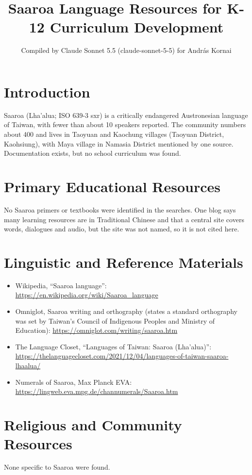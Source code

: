 \documentclass[12pt]{article}
\title{Saaroa Language Resources for K-12 Curriculum Development}
\author{Compiled by Claude Sonnet 5.5 (claude-sonnet-5-5) for Andr\'as Kornai}
\date{}
\begin{document}
\maketitle

\section{Introduction}
Saaroa (Lha'alua; ISO 639-3 sxr) is a critically endangered Austronesian language of Taiwan, with fewer than about 10 speakers reported. The community numbers about 400 and lives in Taoyuan and Kaochung villages (Taoyuan District, Kaohsiung), with Maya village in Namasia District mentioned by one source. Documentation exists, but no school curriculum was found.

\section{Primary Educational Resources}
No Saaroa primers or textbooks were identified in the searches. One blog says many learning resources are in Traditional Chinese and that a central site covers words, dialogues and audio, but the site was not named, so it is not cited here.

\section{Linguistic and Reference Materials}
\begin{itemize}
\item Wikipedia, ``Saaroa language'': \url{https://en.wikipedia.org/wiki/Saaroa_language}
\item Omniglot, Saaroa writing and orthography (states a standard orthography was set by Taiwan's Council of Indigenous Peoples and Ministry of Education): \url{https://omniglot.com/writing/saaroa.htm}
\item The Language Closet, ``Languages of Taiwan: Saaroa (Lha'alua)'': \url{https://thelanguagecloset.com/2021/12/04/languages-of-taiwan-saaroa-lhaalua/}
\item Numerals of Saaroa, Max Planck EVA: \url{https://lingweb.eva.mpg.de/channumerals/Saaroa.htm}
\end{itemize}

\section{Religious and Community Resources}
None specific to Saaroa were found.
\end{document}
